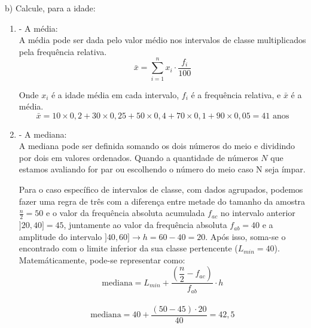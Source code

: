b) Calcule, para a idade:
\\

\begin{enumerate}[i]
    \item- A média: \\

          A média pode ser dada pelo valor médio nos intervalos de classe multiplicados pela frequência relativa.
          \\

          \[
              \bar{x} = \sum_{i=1}^{n} x_i \cdot \frac{f_i}{100}
          \]

          Onde $x_i$ é a idade média em cada intervalo, $f_i$ é a frequência relativa, e $\bar{x}$ é a média.
          \\

          \begin{equation}
              \bar{x}= 10 \times 0,2+30\times 0,25+50\times 0,4+70\times 0,1+90\times 0,05 = 41 \text{ anos}
          \end{equation}

    \item- A mediana: \\

          A mediana pode ser definida somando os dois números do meio e dividindo por dois em valores ordenados. Quando a quantidade de números $N$ que estamos avaliando for par ou escolhendo o número do meio caso N seja ímpar.

          Para o caso específico de intervalos de classe, com dados agrupados, podemos fazer uma regra de três com a diferença entre metade do tamanho da amostra $\frac{n}{2} = 50$ e o valor da frequência absoluta acumulada $f_{ac}$ no intervalo anterior $]20,40]=45$, juntamente ao valor da frequência absoluta $f_{ab}=40$ e a amplitude do intervalo $]40,60]\rightarrow h=60-40=20$. Após isso, soma-se o encontrado com o limite inferior da sua classe pertencente ($L_{min}=40$). Matemáticamente, pode-se representar como:
          \\

          \[
              \text{mediana} = L_{min} + \frac{\left(\dfrac{n}{2}-f_{ac}\right)}{f_{ab}}\cdot h
          \]
          \\

          \begin{equation}
              \text{mediana} = 40 + \frac{(50-45)\cdot 20}{40} = 42,5
          \end{equation}


\end{enumerate}
